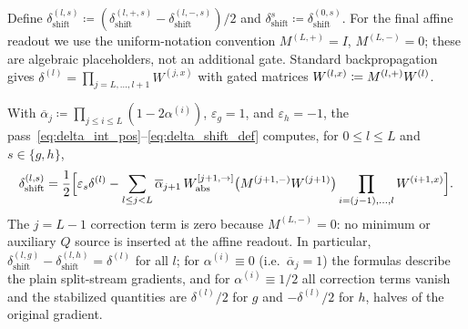 Define $\delta_{\mathrm{shift}}^{(l,s)}\coloneqq(\delta_{\mathrm{shift}}^{(l,+,s)}-\delta_{\mathrm{shift}}^{(l,-,s)})/2$ and $\delta^s_{\mathrm{shift}}\coloneqq\delta_{\mathrm{shift}}^{(0,s)}$. For the final affine readout we use the uniform-notation convention $M^{(L,+)}=I$, $M^{(L,-)}=0$; these are algebraic placeholders, not an additional gate. Standard backpropagation gives $\delta^{(l)} = \prod_{j = L, \dots, l+1} W^{(j,x)}$ with gated matrices $W^{(l,x)} \coloneqq M^{(l,+)} W^{(l)}$.

\begin{theoremenv}\label{thm:closed_formula_shift}
With $\overline{\alpha}_j\coloneqq\prod_{j\le i\le L}(1-2\alpha^{(i)})$, $\varepsilon_g=1$, and $\varepsilon_h=-1$, the pass~\eqref{eq:delta_int_pos}--\eqref{eq:delta_shift_def} computes, for $0\le l\le L$ and $s\in\{g,h\}$,
\begin{equation}
\delta_{\mathrm{shift}}^{(l,s)}
=\frac12\Bigl[\varepsilon_s\delta^{(l)}-\sum_{l\le j<L}\overline{\alpha}_{j+1}\,W_{\mathrm{abs}}^{[j+1,\rightarrow]}\bigl(M^{(j+1,-)}W^{(j+1)}\bigr)\prod_{i=(j-1),\dots,l}W^{(i+1,x)}\Bigr].
\label{eq:closed_formula_g}
\end{equation}
The $j=L-1$ correction term is zero because $M^{(L,-)}=0$: no minimum or auxiliary $Q$ source is inserted at the affine readout. In particular, $\delta_{\mathrm{shift}}^{(l,g)} - \delta_{\mathrm{shift}}^{(l,h)} = \delta^{(l)}$ for all $l$; for $\alpha^{(i)} \equiv 0$ (i.e.\ $\overline{\alpha}_j = 1$) the formulas describe the plain split-stream gradients, and for $\alpha^{(i)} \equiv 1/2$ all correction terms vanish and the stabilized quantities are $\delta^{(l)}/2$ for $g$ and $-\delta^{(l)}/2$ for $h$, halves of the original gradient.\end{theoremenv}

